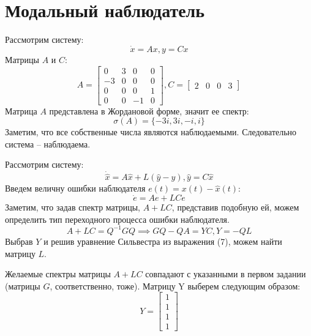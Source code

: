 \section{Модальный наблюдатель}
Рассмотрим систему:
\begin{equation}
    \dot{x} = Ax, y = Cx
\end{equation}
Матрицы $A$ и $C$:
\begin{equation*}
    A = \begin{bmatrix}
        0 & 3 & 0 & 0 \\
        -3 & 0 & 0 & 0 \\
        0 & 0 & 0 & 1 \\
        0 & 0 & -1 & 0
    \end{bmatrix},
    C = \begin{bmatrix}
        2 & 0 & 0 & 3
    \end{bmatrix}
\end{equation*}
Матрица $A$ представлена в Жордановой форме, значит ее спектр:
\begin{equation*}
    \sigma (A) = \{-3i,3i,-i,i\}
\end{equation*}
Заметим, что все собственные числа являются наблюдаемыми. Следовательно система -- наблюдаема.

Рассмотрим систему:
\begin{equation}
    \dot{\hat x} = A\hat x + L(\hat y - y), \hat y = C\hat x
\end{equation}
Введем величну ошибки наблюдателя $e(t)=x(t)-\hat x(t)$:
\begin{equation}
    \dot e = Ae + LCe
\end{equation}
Заметим, что задав спектр матрицы, $A + LC$, представив подобную ей, можем определить тип переходного процесса ошибки наблюдателя.
\begin{equation}
    A+LC = Q^{-1}GQ \implies GQ - QA = YC, Y = -QL 
\end{equation}
Выбрав $Y$ и решив уравнение Сильвестра из выражения (7), можем найти матрицу $L$.

Желаемые спектры матрицы $A + LC$ совпадают с указанными в первом задании (матрицы $G$, соответственно, тоже).
Матрицу Y выберем следующим образом:
\begin{equation*}
    Y = \begin{bmatrix}
        1 \\ 1 \\ 1 \\ 1
    \end{bmatrix}
\end{equation*}


